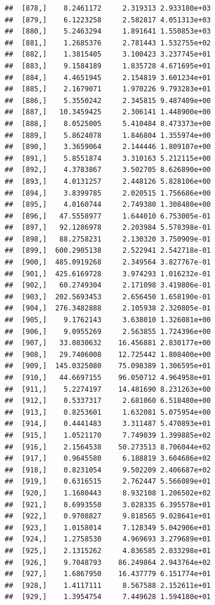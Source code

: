 \documentclass[article]{jss}\usepackage[]{graphicx}\usepackage[]{xcolor}
\makeatletter
\newenvironment{kframe}{%
 \def\at@end@of@kframe{}%
 \ifinner\ifhmode%
  \def\at@end@of@kframe{\end{minipage}}%
  \begin{minipage}{\columnwidth}%
 \fi\fi%
 \def\FrameCommand##1{\hskip\@totalleftmargin \hskip-\fboxsep
 \colorbox{shadecolor}{##1}\hskip-\fboxsep
     \hskip-\linewidth \hskip-\@totalleftmargin \hskip\columnwidth}%
 \MakeFramed {\advance\hsize-\width
   \@totalleftmargin\z@ \linewidth\hsize
   \@setminipage}}%
 {\par\unskip\endMakeFramed%
 \at@end@of@kframe}
\newenvironment{knitrout}{}{} %
\makeatother
\begin{document}
\begin{knitrout}
\begin{kframe}
\begin{verbatim}
##  [878,]    8.2461172     2.319313 2.933180e+03
##  [879,]    6.1223258     2.582817 4.051313e+03
##  [880,]    5.2463294     1.891641 1.550853e+03
##  [881,]    1.2685376     2.781443 1.532755e+02
##  [882,]    1.3815405     3.100423 3.237745e+01
##  [883,]    9.1584189     1.835728 4.671695e+01
##  [884,]    4.4651945     2.154819 3.601234e+01
##  [885,]    2.1679071     1.970226 9.793283e+01
##  [886,]    5.3550242     2.345815 9.487409e+00
##  [887,]   10.3459425     2.306141 1.448900e+00
##  [888,]    8.0525005     5.410484 8.473373e+00
##  [889,]    5.8624078     1.846804 1.355974e+00
##  [890,]    3.3659064     2.144446 1.809107e+00
##  [891,]    5.8551874     3.310163 5.212115e+00
##  [892,]    4.3783867     3.502705 8.626890e+00
##  [893,]    4.0131257     2.448126 5.828106e+00
##  [894,]    3.8399785     2.020515 1.756686e+00
##  [895,]    4.0160744     2.749380 1.308480e+00
##  [896,]   47.5558977     1.644010 6.753005e-01
##  [897,]   92.1286978     2.203984 5.578398e-01
##  [898,]   88.2758231     2.130320 3.750909e-01
##  [899,]  600.2905138     2.522941 2.542718e-01
##  [900,]  485.0919268     2.349564 3.827767e-01
##  [901,]  425.6169728     3.974293 1.016232e-01
##  [902,]   60.2749304     2.171098 3.419806e-01
##  [903,]  202.5693453     2.656450 1.658190e-01
##  [904,]  276.3482888     2.105938 2.320805e-01
##  [905,]    9.1762143     3.638010 1.326081e+00
##  [906,]    9.0955269     2.563855 1.724396e+00
##  [907,]   33.0830632    16.456881 2.830177e+00
##  [908,]   29.7406008    12.725442 1.808400e+00
##  [909,]  145.0325080    75.098389 1.306595e+01
##  [910,]   44.6697155    96.050712 4.964958e+01
##  [911,]    5.2274197    14.481690 8.231263e+00
##  [912,]    0.5337317     2.681060 6.518480e+00
##  [913,]    0.8253601     1.632081 5.075954e+00
##  [914,]    0.4441483     3.311487 5.470893e+01
##  [915,]    1.0521170     7.749039 1.399885e+02
##  [916,]    2.1564538    50.273513 8.706044e+02
##  [917,]    0.9645580     6.188819 3.604686e+02
##  [918,]    0.8231054     9.502209 2.406687e+02
##  [919,]    0.6316515     2.762447 5.566089e+01
##  [920,]    1.1680443     8.932108 1.206502e+02
##  [921,]    0.6993550     3.028335 6.395578e+01
##  [922,]    0.9708827     9.818565 9.028641e+01
##  [923,]    1.0158014     7.128349 5.042906e+01
##  [924,]    1.2758530     4.969693 3.279689e+01
##  [925,]    2.1315262     4.836585 2.033298e+01
##  [926,]    9.7048793    86.249864 2.943764e+02
##  [927,]    1.6867950    16.437779 6.151774e+01
##  [928,]    1.4117111     8.567588 2.152611e+01
##  [929,]    1.3954754     7.449628 1.594180e+01

\end{verbatim}
\end{kframe}
\end{knitrout}
\end{document}
